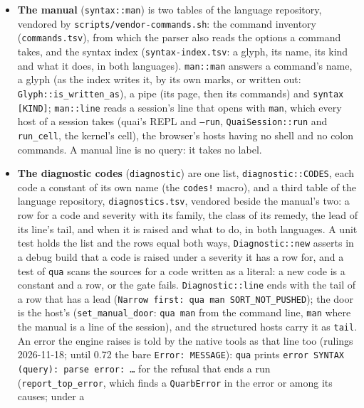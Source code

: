 \documentclass{report}
\begin{document}
\begin{itemize}
  streamed rows was a seek and a read a row. A session, a run that
  keeps the arbor (\texttt{--kaiv}, \texttt{--save}, the resident
  server) and \texttt{--no-stream} mount whole.
\item \textbf{The manual} (\texttt{syntax::man}) is two tables of
  the language repository, vendored by
  \texttt{scripts/vendor-commands.sh}: the command inventory
  (\texttt{commands.tsv}), from which the parser also reads the
  options a command takes, and the syntax index
  (\texttt{syntax-index.tsv}: a glyph, its name, its kind and what it
  does, in both languages). \texttt{man::man} answers a command's
  name, a glyph (as the index writes it, by its own marks, or
  written out: \texttt{Glyph::is\_written\_as}), a pipe (its page,
  then its commands) and \texttt{syntax [KIND]}; \texttt{man::line}
  reads a session's line that opens with \texttt{man}, which every
  host of a session takes (quai's REPL and \texttt{--run},
  \texttt{QuaiSession::run} and \texttt{run\_cell}, the kernel's
  cell), the browser's hosts having no shell and no colon commands.
  A manual line is no query: it takes no label.
\item \textbf{The diagnostic codes} (\texttt{diagnostic}) are one
  list, \texttt{diagnostic::CODES}, each code a constant of its own
  name (the \texttt{codes!} macro), and a third table of the
  language repository, \texttt{diagnostics.tsv}, vendored beside
  the manual's two: a row for a code and severity with its family,
  the class of its remedy, the lead of its line's tail, and when it
  is raised and what to do, in both languages. A unit test holds
  the list and the rows equal both ways, \texttt{Diagnostic::new}
  asserts in a debug build that a code is raised under a severity
  it has a row for, and a test of \texttt{qua} scans the sources
  for a code written as a literal: a new code is a constant and a
  row, or the gate fails. \texttt{Diagnostic::line} ends with the
  tail of a row that has a lead (\texttt{Narrow first: qua man
  SORT\_NOT\_PUSHED}); the door is the host's
  (\texttt{set\_manual\_door}: \texttt{qua man} from the command
  line, \texttt{man} where the manual is a line of the session),
  and the structured hosts carry it as \texttt{tail}. An error
  the engine raises is told by the native tools as that line too
  (rulings 2026-11-18; until 0.72 the bare \texttt{Error:
  MESSAGE}): \texttt{qua} prints \texttt{error SYNTAX (query):
  parse error: \ldots} for the refusal that ends a run
  (\texttt{report\_top\_error}, which finds a
  \texttt{QuarbError} in the error or among its causes; under a

\end{itemize}
\end{document}
